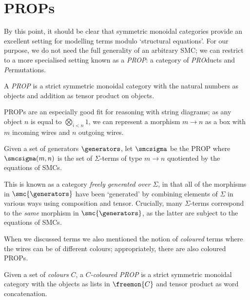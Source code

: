 \section{PROPs}

By this point, it should be clear that symmetric monoidal categories provide
an excellent setting for modelling terms modulo `structural equations'.
For our purpose, we do not need the full generality of an arbitrary SMC; we can
restrict to a more specialised setting known as a \emph{PROP}: a category of
\emph{PRO}ducts and \emph{P}ermutations.

\begin{definition}
    A \emph{PROP} is a strict symmetric monoidal category with the
    natural numbers as objects and addition as tensor product on objects.
\end{definition}

PROPs are an especially good fit for reasoning with string diagrams; as any
object \(n\) is equal to \(\bigotimes_{i < n} 1\), we can represent a morphism
\(m \to n\) as a box with \(m\) incoming wires and \(n\) outgoing wires.

\begin{definition}\label{def:freely-generated-prop}
    Given a set of generators \(\generators\), let \(\smcsigma\) be the
    PROP where \(\smcsigma(m, n)\) is the set of \(\Sigma\)-terms of type
    \(m \to n\) quotiented by the equations of SMCs.
\end{definition}

This is known as a category \emph{freely generated over} \(\Sigma\), in that all
of the morphisms in \(\smc{\generators}\) have been `generated' by combining
elements of \(\Sigma\) in various ways using composition and tensor.
Crucially, many \(\Sigma\)-terms correspond to the \emph{same} morphism in
\(\smc{\generators}\), as the latter are subject to the equations of SMCs.

When we discussed terms we also mentioned the notion of \emph{coloured} terms
where the wires can be of different colours; appropriately, there are also
coloured PROPs.

\begin{definition}
    Given a set of \emph{colours} \(C\), a \emph{\(C\)-coloured PROP} is a strict
    symmetric monoidal category with the objects as lists in \(\freemon{C}\) and
    tensor product as word concatenation.
\end{definition}

